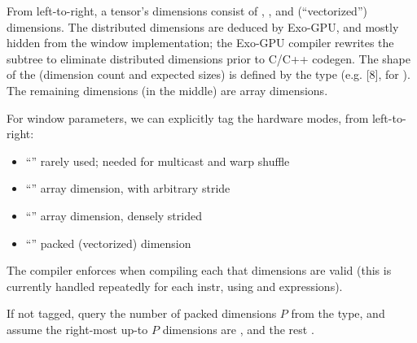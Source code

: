 From left-to-right, a tensor's dimensions consist of , , and  (``vectorized'') dimensions.
The distributed dimensions are deduced by Exo-GPU, and mostly hidden from the window implementation; the Exo-GPU compiler rewrites the subtree to eliminate distributed dimensions prior to C/C++ codegen.
The shape of the  (dimension count and expected sizes) is defined by the  type (e.g. [8], for ).
The remaining dimensions (in the middle) are array dimensions.




\filbreak




\filbreak
For window parameters, we can explicitly tag the hardware modes, from left-to-right:
\begin{itemize}
  \item ``'' rarely used; needed for multicast and warp shuffle
  \filbreak
  \item ``'' array dimension, with arbitrary stride
  \filbreak
  \item ``'' array dimension, densely strided
  \filbreak
  \item ``'' packed (vectorized) dimension
\end{itemize}

\filbreak
The compiler enforces when compiling each  that  dimensions are valid (this is currently handled repeatedly for each instr, using  and  expressions).

\filbreak
{} If not tagged, query the number of packed dimensions $P$ from the  type, and assume the right-most up-to $P$ dimensions are , and the rest .

\filbreak
{}



\filbreak
{}



\filbreak
{}



